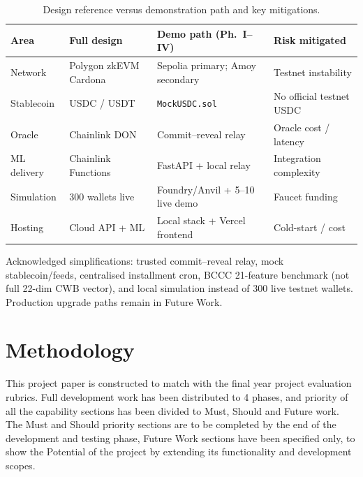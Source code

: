\documentclass[12pt,a4paper]{report}
\newcommand{\tableheadcolor}{\rowcolor{TableHeadBg}}
\begin{document}
\begin{table}[H]
\centering
\small
\caption[Design reference versus demonstration path]{Design reference versus demonstration path and key mitigations.}
\label{tab:design-vs-demo}
\label{tab:zero-cost-risks}
\begin{tabular}{@{}p{2.8cm}p{4.2cm}p{4.2cm}p{3.2cm}@{}}
\toprule
\tableheadcolor
\textbf{Area} & \textbf{Full design} & \textbf{Demo path (Ph.~I--IV)} & \textbf{Risk mitigated} \\
\midrule
Network & Polygon zkEVM Cardona & Sepolia primary; Amoy secondary & Testnet instability \\
Stablecoin & USDC / USDT & \texttt{MockUSDC.sol} & No official testnet USDC \\
Oracle & Chainlink DON & Commit--reveal relay & Oracle cost / latency \\
ML delivery & Chainlink Functions & FastAPI + local relay & Integration complexity \\
Simulation & 300 wallets live & Foundry/Anvil + 5--10 live demo & Faucet funding \\
Hosting & Cloud API + ML & Local stack + Vercel frontend & Cold-start / cost \\
\bottomrule
\end{tabular}
\end{table}

\noindent Acknowledged simplifications: trusted commit--reveal relay, mock stablecoin/feeds, centralised installment cron, BCCC 21-feature benchmark (not full 22-dim CWB vector), and local simulation instead of 300 live testnet wallets. Production upgrade paths remain in Future Work.


\chapter{Methodology}
\label{ch:methodology}

This project paper is constructed to match with the final year project evaluation rubrics. Full development work has been distributed to 4 phases, and priority of all the capability sections has been divided to Must, Should and Future work. The Must and Should priority sections are to be completed by the end of the development and testing phase, Future Work sections have been specified only, to show the Potential of the project by extending its functionality and development scopes.
\end{document}
